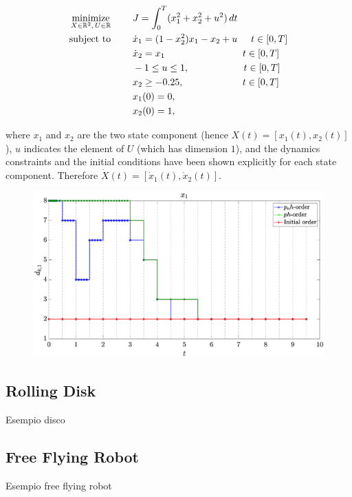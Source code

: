 \begin{subequations}\label{eq:vanderpol}
	\begin{align}
	\underset{X \in \mathbb{R}^{2}, \, U \in \mathbb{R}}{\text{minimize}}\hspace{8mm} 
	&J = \int_{0}^{T}(x_1^{2} + x_2^{2} + u^{2})\,dt  \label{eq:vancost}\\
	\text{subject to} \hspace{8mm} 
	& \dot{x}_1 = (1 - x_2^{2})x_{1} - x_2 + u \hspace{5mm} t \in[0,T] \label{eq:vandyn1}\\
	& \dot{x}_2 = x_1 \hspace{28.5mm} t \in[0,T] \label{eq:vandyn2}\\
	& -1  \leq u \leq 1,  \hspace{20mm} t \in[0,T] \label{eq:vanpath1}\\
	& x_2 \geq -0.25,  \hspace{21.5mm} t \in[0,T] \label{eq:vanpath2}\\
	& x_1(0) = 0, \label{eq:initial1}\\		
	& x_2(0) = 1, \label{eq:intial2}		
	\end{align}
\end{subequations}

where $x_1$ and $x_2$ are the two state component (hence $X(t) = [x_1(t), x_2(t)]$), $u$ indicates the element of $U$ (which has dimension $1$), and the dynamics constraints and the initial conditions have been shown explicitly for each state component. Therefore $\dot{X}(t) = [\dot{x}_1(t), \dot{x}_2(t)]$.

\begin{figure}
	\centering
	\includegraphics[trim={4cm 0cm 4cm 0cm},clip,width=1.\linewidth]{Img/pnh1_vanderpol}
	\caption{}
	\label{fig:pnhvanderpol}
\end{figure}


\subsection*{Rolling Disk}
Esempio disco

\subsection*{Free Flying Robot}
Esempio free flying robot

